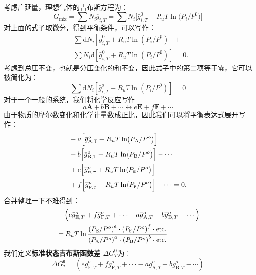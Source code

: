 \documentclass[10pt, landscape]{extarticle}
\numberwithin{equation}{section}
\begin{document}
\begin{multicols}{3}
{
    \scriptsize\color{gray}
    考虑广延量，理想气体的吉布斯方程为：
    \[
        G_{\mathrm{mix}}=\sum N_{i}\overline{{{g}}}_{i,T}=\sum N_{i}\bigl[\bar{g}_{i,T}^{0}+R_{u}T\ln\bigl(P_{i}/P^{0}\bigr)\bigr]
    \]
    对上面的式子取微分，得到平衡条件，可以写作：
    \[
        \begin{aligned}
        &\sum{\mathrm{d}{N}}_{i}\left[\bar{g}_{i,T}^{0}+R_{u}T\ln\left(P_{i}/P^{0}\right)\right]+\\
        &\sum{N}_{i}\mathrm{d}\left[\bar{g}_{i,T}^{0}+R_{u}T\ln\left(P_{i}/P^{0}\right)\right]=0.
        \end{aligned}
    \]
    考虑到总压不变，也就是分压变化的和不变，因此式子中的第二项等于零，它可以被简化为：
    \[\sum{\mathrm{d}{N}}_{i}\left[\bar{g}_{i,T}^{o}+R_{u}T\ln\left(P_{i}/P^{0}\right)\right]=0\]
    对于一个一般的系统，我们将化学反应写作
    \[a\mathbf{A}+b\mathbf{B}+\cdots\leftrightarrow e\mathbf{E}+f\mathbf{F}+\cdots\]
    由于物质的摩尔数变化和化学计量数成正比，因此我们可以将平衡表达式展开写作：
    \[
        \begin{aligned}
            &-a\Bigl[\bar{g}_\mathrm{A,T}^{o}+R_{u}T\ln\bigl(P_{\mathrm{A}}/P^{o}\bigr)\Bigr]\\
            &-b\Bigl[\bar{g}_{\mathrm{B,T}}^{o}+R_{u}T\ln\bigl(P_{\mathrm{B}}/P^{o}\bigr)\Bigr]-\cdots\\
            &+e\Bigl[\overline{{{g}}}_{\scriptscriptstyle\mathrm{E,}T}^{o}+R_{u}T\ln\bigl(P_{\scriptscriptstyle\mathrm{E}}/P^{o}\bigr)\Bigr]\\
            &+f\Bigl[\overline{{{g}}}_{\scriptscriptstyle\mathrm{F,}T}^{o}+R_{u}T\ln\bigl(P_{\scriptscriptstyle\mathrm{F}}/P^{o}\bigr)\Bigr]+\cdots=0.
        \end{aligned}
    \]
    合并整理一下不难得到：
    \[
        \begin{aligned}
            &-\Bigl(e\bar{g}_{\mathrm{E},T}^{o}+f\overline{{{g}}}_{\mathrm{F},T}^{o}+\cdot\cdot\cdot-a\overline{{{g}}}_{\mathrm{A},T}^{o}-b\overline{{{g}}}_{\mathrm{B},T}^{o}-\cdots\Bigr)\\
            &=R_{u}T\ln{\frac{\left(P_{\mathrm{E}}/P^{o}\right)^{e}\cdot\left(P_{\mathrm{F}}/P^{o}\right)^{f}\cdot\mathrm{etc.}}{\left(P_{\mathrm{A}}/P^{o}\right)^{a}\cdot\left(P_{\mathrm{B}}/P^{o}\right)^{b}\cdot\mathrm{etc.}}}
        \end{aligned}\]
}
我们定义\textbf{标准状态吉布斯函数差 $\Delta G_T^0$}为：
\begin{equation}
    \Delta G_T^0 = (e\bar{g}_{\mathrm{E},T}^{o}+f\overline{{{g}}}_{\mathrm{F},T}^{o}+\cdot\cdot\cdot-a\overline{{{g}}}_{\mathrm{A},T}^{o}-b\overline{{{g}}}_{\mathrm{B},T}^{o}-\cdots)

\end{equation}
\end{multicols}
\end{document}
